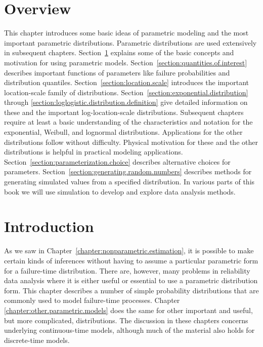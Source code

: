 \section*{Overview}
This chapter introduces some basic ideas of parametric modeling and
the most important parametric distributions. Parametric
distributions are used extensively in subsequent chapters.
Section~\ref{section:par.dist.intro} explains some of the basic
concepts and motivation for using parametric models.
Section~\ref{section:quantities.of.interest} describes important
functions of parameters like failure probabilities and
distribution quantiles. Section~\ref{section:location.scale}
introduces the important location-scale family of distributions.
Section~\ref{section:exponential.distribution} through
\ref{section:loglogistic.distribution.definition} give detailed
information on these and the  important log-location-scale distributions.
Subsequent chapters require at least a basic understanding of the
characteristics and notation for the exponential, Weibull, and
lognormal distributions. Applications for the other distributions
follow without difficulty. Physical motivation for these and the other
distributions is helpful in practical modeling applications.
Section~\ref{section:parameterization.choice} describes alternative
choices for parameters.
Section~\ref{section:generating.random.numbers} describes methods for
generating simulated values from a specified distribution. In various
parts of this book we will use simulation to develop and explore data
analysis methods.


\section{Introduction}
\label{section:par.dist.intro}
As we saw in
Chapter~\ref{chapter:nonparametric.estimation}, it is possible to make
certain kinds of inferences without having to assume a particular 
parametric form
for a failure-time distribution. There are, however, many problems
in reliability data analysis where it is either useful or essential to
use a parametric distribution form.  This chapter describes a number of
simple probability distributions that are commonly used to model
failure-time processes.  Chapter
\ref{chapter:other.parametric.models} does the same for other
important and useful, but more complicated, distributions.  The
discussion in these chapters concerns underlying continuous-time
models, although much of the material also holds for discrete-time
models.

